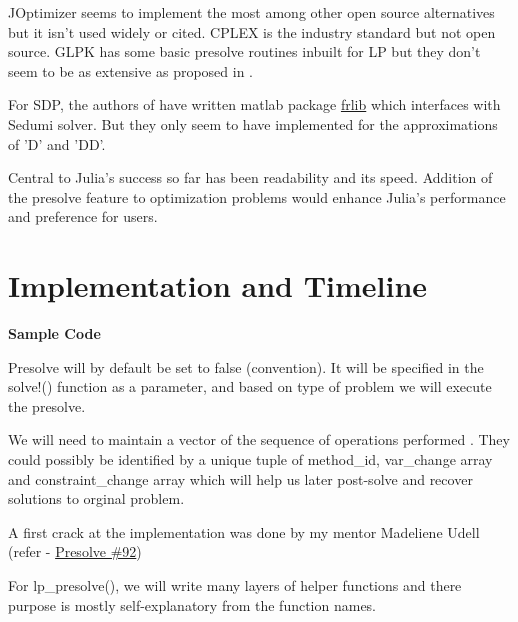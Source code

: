 \documentclass[twoside]{article}
\begin{document}
\begin{multicols}{2}
JOptimizer seems to implement the most among other open source alternatives but it isn't used widely or cited. CPLEX is the industry standard but not open source. GLPK has some basic presolve routines inbuilt for LP but they don't seem to be as extensive as proposed in \cite{ipm:Andersen9}. 

For SDP, the authors of \cite{permenter2014partial} have written matlab package \href{https://github.com/frankpermenter/frlib}{frlib} which interfaces with Sedumi solver. But they only seem to have implemented for the approximations of 'D' and 'DD'. 

Central to Julia's success so far has been readability and its speed. Addition of the presolve feature to optimization problems would enhance Julia's performance and preference for users. 
\vspace*{-\baselineskip}

\section{\textbf{Implementation and Timeline}}

\textbf{\color{blue}Sample Code}

Presolve will by default be set to false (convention). It will be specified in the solve!() function as a parameter, and based on type of problem we will execute the presolve. 

We will need to maintain a vector of the sequence of operations performed . They could possibly be identified by a unique tuple of method\_id, var\_change array and constraint\_change array which will help us later post-solve and recover solutions to orginal problem. 

A first crack at the implementation was done by my mentor Madeliene Udell (refer - 
\href{https://github.com/JuliaOpt/Convex.jl/pull/92}{Presolve \#92})

For lp\_presolve(), we will write many layers of helper functions and there purpose is mostly self-explanatory from the function names. 


\end{multicols}
\end{document}
